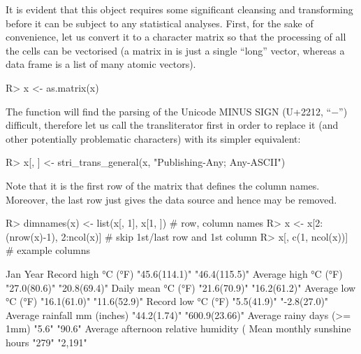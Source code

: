 \documentclass[nojss]{jss}
\begin{document}
It is evident that this object requires some significant cleansing
and transforming before it can be subject to any statistical analyses.
First, for the sake of convenience, let us convert it to a character
matrix so that the processing of all the cells can be vectorised
(a matrix in  is just a single ``long'' vector,
whereas a data frame is a list of many atomic vectors).

\begin{Schunk}
\begin{Sinput}
R> x <- as.matrix(x)
\end{Sinput}
\end{Schunk}

The  function will find the parsing of
the Unicode MINUS SIGN (U+2212, ``−'') difficult,
therefore let us call the transliterator first in order to replace it
(and other potentially problematic characters) with its simpler equivalent:

\begin{Schunk}
\begin{Sinput}
R> x[, ] <- stri_trans_general(x, "Publishing-Any; Any-ASCII")
\end{Sinput}
\end{Schunk}

Note that it is the first row of the matrix that defines the column names.
Moreover, the last row just gives the data source and hence may be removed.

\begin{Schunk}
\begin{Sinput}
R> dimnames(x) <- list(x[, 1], x[1, ])  # row, column names
R> x <- x[2:(nrow(x)-1), 2:ncol(x)]     # skip 1st/last row and 1st column
R> x[, c(1, ncol(x))]  # example columns
\end{Sinput}
\begin{Soutput}
                                        Jan           Year
Record high °C (°F)                     "45.6(114.1)" "46.4(115.5)"
Average high °C (°F)                    "27.0(80.6)"  "20.8(69.4)"
Daily mean °C (°F)                      "21.6(70.9)"  "16.2(61.2)"
Average low °C (°F)                     "16.1(61.0)"  "11.6(52.9)"
Record low °C (°F)                      "5.5(41.9)"   "-2.8(27.0)"
Average rainfall mm (inches)            "44.2(1.74)"  "600.9(23.66)"
Average rainy days (>= 1mm)             "5.6"         "90.6"
Average afternoon relative humidity (%) "47"          "51"
Mean monthly sunshine hours             "279"         "2,191"
\end{Soutput}
\end{Schunk}
\end{document}

